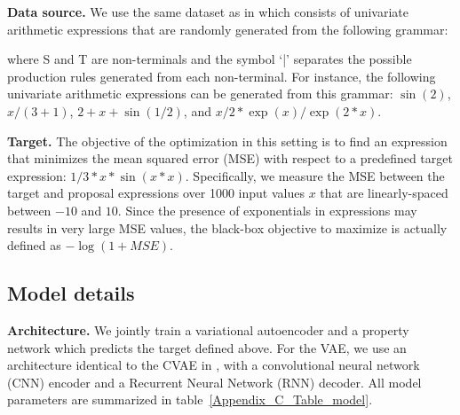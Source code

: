 \textbf{Data source.} We use the same dataset as in \citet{kusner2017grammar} which consists of univariate arithmetic expressions that are randomly generated from the following grammar:
\vspace{-4mm}
\begin{center}
\end{center}
\vspace{-4mm}
where S and T are non-terminals and the symbol `|' separates the possible production rules generated from each non-terminal. For instance, the following univariate arithmetic expressions can be generated from this grammar: $\sin(2)$, $x/(3+1)$, $2+x+\sin(1/2)$, and $x/2 * \exp(x)/\exp(2 * x)$. 

\textbf{Target.} The objective of the optimization in this setting is to find an expression that minimizes the mean squared error (MSE) with respect to a predefined target expression: $1/3 * x * \sin(x*x)$. Specifically, we measure the MSE between the target and proposal expressions over 1000 input  values $x$ that  are  linearly-spaced  between $-10$ and $10$.
Since the presence of exponentials in expressions may results in very large MSE values, the black-box objective to maximize is actually defined as $-\log(1+MSE)$.

\subsection{Model details}
\label{Appendix_C.2_Arithmetic_expression_Model}

\textbf{Architecture.} We jointly train a variational autoencoder and a property network which predicts the target defined above. For the VAE, we use an architecture identical to the CVAE in \citet{kusner2017grammar}, with a convolutional neural network (CNN) encoder and a Recurrent Neural Network (RNN) decoder. All model parameters are summarized in table~\ref{Appendix_C_Table_model}.

